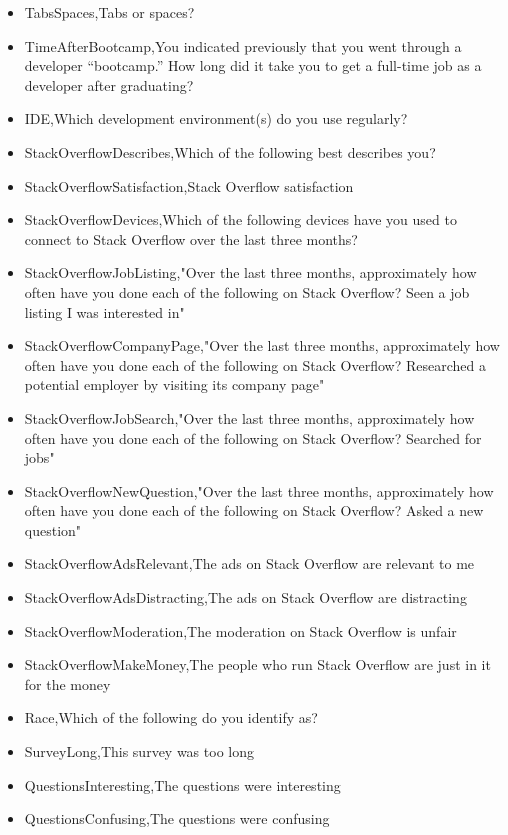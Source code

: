 \begin{appendices}
\begin{itemize}
        \item TabsSpaces,Tabs or spaces?
        \item TimeAfterBootcamp,You indicated previously that you went through a developer “bootcamp.” How long did it take you to get a full-time job as a developer after graduating?
        \item IDE,Which development environment(s) do you use regularly?
        \item StackOverflowDescribes,Which of the following best describes you?
        \item StackOverflowSatisfaction,Stack Overflow satisfaction
        \item StackOverflowDevices,Which of the following devices have you used to connect to Stack Overflow over the last three months?
        \item StackOverflowJobListing,"Over the last three months, approximately how often have you done each of the following on Stack Overflow? Seen a job listing I was interested in"
        \item StackOverflowCompanyPage,"Over the last three months, approximately how often have you done each of the following on Stack Overflow? Researched a potential employer by visiting its company page"
        \item StackOverflowJobSearch,"Over the last three months, approximately how often have you done each of the following on Stack Overflow? Searched for jobs"
        \item StackOverflowNewQuestion,"Over the last three months, approximately how often have you done each of the following on Stack Overflow? Asked a new question"
        \item StackOverflowAdsRelevant,The ads on Stack Overflow are relevant to me
        \item StackOverflowAdsDistracting,The ads on Stack Overflow are distracting
        \item StackOverflowModeration,The moderation on Stack Overflow is unfair
        \item StackOverflowMakeMoney,The people who run Stack Overflow are just in it for the money
        \item Race,Which of the following do you identify as?
        \item SurveyLong,This survey was too long
        \item QuestionsInteresting,The questions were interesting
        \item QuestionsConfusing,The questions were confusing

\end{itemize}
\end{appendices}
